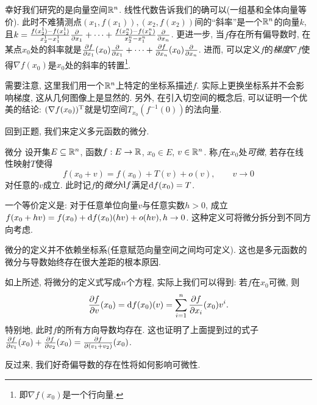 幸好我们研究的是向量空间$\mathbb{R} ^n$. 线性代数告诉我们的确可以(一组基和全体向量等价). 此时不难猜测点$(x_1,f(x_1)),(x_2,f(x_2))$间的“斜率”是一个$\mathbb{R} ^n$的向量$k$, 且$k= \frac{f(x_2^1)-f(x_1^1)}{x_2^1-x_1^1} \frac{\partial}{\partial x_1} + \cdots + \frac{f(x_2^n)-f(x_1^n)}{x_2^n-x_1^n}\frac{\partial}{\partial x_n}$. 更进一步, 当$f$存在所有偏导数时, 在某点$x_0$处的斜率就是$\frac{\partial f}{\partial x_1}(x_0) \frac{\partial}{\partial x_1} + \cdots + \frac{\partial f}{\partial x_n}(x_0) \frac{\partial}{\partial x_n}$. 进而, 可以定义$f$的\textit{梯度}$\nabla f$使得$\nabla f(x_0)$是$x_0$处的斜率的转置\footnote{即$\nabla f(x_0)$是一个行向量. }. 

需要注意, 这里我们用一个$\mathbb{R} ^n$上特定的坐标系描述$f$. 实际上更换坐标系并不会影响梯度, 这从几何图像上是显然的. 另外, 在引入切空间的概念后, 可以证明一个优美的结论: $(\nabla f(x_0))^{\operatorname{T}}$就是切空间$T_{x_0}(f^{-1}(0))$的法向量. 

回到正题, 我们来定义多元函数的微分. 

\begin{definition}{微分}
	设开集$E \subseteq \mathbb{R} ^n$, 函数$f: E \to \mathbb{R}$, $x_0 \in E$, $v \in \mathbb{R} ^n$. 称$f$在$x_0$处\textit{可微}, 若存在线性映射$T$使得$$f(x_0+v) = f(x_0) + T(v) + o(v),\qquad v \to 0$$
	对任意的$v$成立. 此时记$f$的\textit{微分}$\mathop{}\!\mathrm{d} f$满足$\mathop{}\!\mathrm{d} f(x_0)=T$. 
\end{definition}
\begin{remark}
	一个等价定义是: 对于任意单位向量$v$与任意实数$h>0$, 成立$f(x_0+hv) = f(x_0) + \mathop{}\!\mathrm{d} f(x_0) (hv) + o(hv),h \to 0$. 这种定义可将微分拆分到不同方向考虑. 
\end{remark}
\begin{remark}
	微分的定义并不依赖坐标系(任意赋范向量空间之间均可定义). 这也是多元函数的微分与导数始终存在很大差距的根本原因. 
\end{remark}

如上所述, 将微分的定义式写成$n$个方程, 实际上我们可以得到: 若$f$在$x_0$可微, 则$$ \frac{\partial f}{\partial v}(x_0) = \mathop{}\!\mathrm{d} f(x_0)(v) = \sum_{i=1}^{n} \frac{\partial f}{\partial x_i}(x_0)v^i.$$
特别地, 此时$f$的所有方向导数均存在. 这也证明了上面提到过的式子$\frac{\partial f}{\partial v_1}(x_0) + \frac{\partial f}{\partial v_2}(x_0) = \frac{\partial f}{\partial (v_1+v_2)}(x_0)$. 

反过来, 我们好奇偏导数的存在性将如何影响可微性. 

